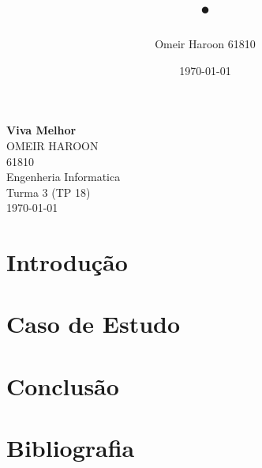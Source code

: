 \documentclass[10pt,a4paper]{article}
\title{•}
\author{Omeir Haroon 61810}
\date{\today}
\begin{document}
\begin{titlepage}
	\center
	{\LARGE\bfseries Viva Melhor}\\
	{\Large OMEIR HAROON}\\
	{\Large 61810}\\
	{\Large Engenheria Informatica}\\
	{\Large Turma 3 (TP 18)}\\
	{\large \today}\\
\end{titlepage}

\pagestyle{plain}

\section{Introdução}

\section{Caso de Estudo}

\section{Conclusão}

\newpage

\section{Bibliografia}


\printindex
\end{document}
